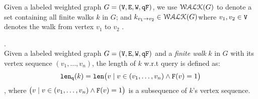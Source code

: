 %
Given a labeled weighted graph $G = (\mathtt{V}, \mathtt{E}, \mathtt{W}, \mathtt{qF})$, 
we use $\mathcal{WALK}(G)$ to denote a set containing all finite walks $k$ in $G$;
and $k_{v_1 \to v_2} \in \mathcal{WALK}(G)$where $v_1, v_2 \in \mathtt{V}$ denotes the walk from vertex $v_1$ to $v_2$ .
%
%
\begin{defn}.
\label{def:qlen}
\\
Given a labeled weighted graph $G = (\mathtt{V}, \mathtt{E}, \mathtt{W}, \mathtt{qF})$ and a \emph{finite walk} $k$ in $G$ with its vertex sequence $(v_1, \ldots, v_{n})$, the length of $k$ w.r.t query is defined as:
\[
  \mathtt{len}_{\tt q}(k) = \mathtt{len}\big(
  v \mid v \in (v_1, \ldots, v_{n}) \land \mathtt{F}(v) = 1 \big)
\]
, where $\big(v \mid v \in (v_1, \ldots, v_{n}) \land \mathtt{F}(v) = 1 \big)$ is a subsequence of $k$'s vertex sequence.
\end{defn}
%
%
% 
%
